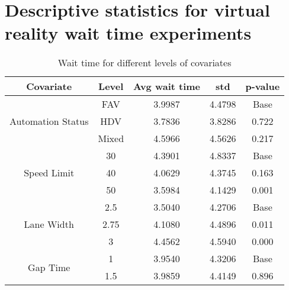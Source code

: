\chapter{Descriptive statistics for virtual reality wait time experiments}
\label{A:data}


\begin{small}
\begin{longtable}{|ccccc|}
\caption{Wait time for different levels of covariates}\\
\hline
\textbf{Covariate}                        & \textbf{Level}  & \textbf{Avg wait time} & \textbf{std } & \textbf{p-value} \\ \hline\hline
\endhead
\multirow{3}{*}{Automation  Status}       & FAV             & 3.9987                       & 4.4798                       & Base             \\ 
                                          & HDV             & 3.7836                       & 3.8286                       & 0.722            \\ 
                                          & Mixed           & 4.5966                       & 4.5626                       & 0.217            \\ \hline
\multirow{3}{*}{Speed Limit}              & 30              & 4.3901                       & 4.8337                       & Base             \\ 
                                          & 40              & 4.0629                       & 4.3745                       & 0.163            \\ 
                                          & 50              & 3.5984                       & 4.1429                       & 0.001            \\ \hline
\multirow{3}{*}{Lane Width}               & 2.5             & 3.5040                       & 4.2706                       & Base             \\ 
                                          & 2.75            & 4.1080                       & 4.4896                       & 0.011            \\ 
                                          & 3               & 4.4562                       & 4.5940                       & 0.000            \\ \hline
\multirow{3}{*}{Gap Time}                 & 1               & 3.9540                       & 4.3206                       & Base             \\ 
                                          & 1.5             & 3.9859                       & 4.4149                       & 0.896            \\ 

\end{longtable}
\end{small}
